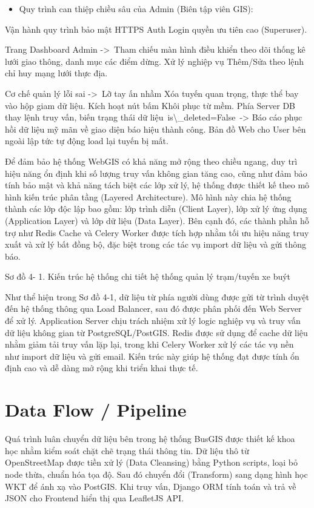 \documentclass[13pt,a4paper]{report}
\begin{document}
\begin{itemize}
    \item Quy trình can thiệp chiều sâu của Admin (Biên tập viên GIS):
\end{itemize}

Vận hành quy trình bảo mật HTTPS Auth Login quyền ưu tiên cao (Superuser).

Trang Dashboard Admin -> Tham chiếu màn hình điều khiển theo dõi thống kê lưới giao thông, danh mục các điểm dừng. Xử lý nghiệp vụ Thêm/Sửa theo lệnh chỉ huy mạng lưới thực địa.

Cơ chế quản lý lỗi sai -> Lỡ tay ấn nhầm Xóa tuyến quan trọng, thực thể bay vào hộp giam dữ liệu. Kích hoạt nút bấm Khôi phục từ mềm. Phía Server DB thay lệnh truy vấn, biến trạng thái dữ liệu is\textbackslash{}_deleted=False -> Báo cáo phục hồi dữ liệu mỹ mãn về giao diện báo hiệu thành công. Bản đồ Web cho User bên ngoài lập tức tự động load lại tuyến bị mất.

Để đảm bảo hệ thống WebGIS có khả năng mở rộng theo chiều ngang, duy trì hiệu năng ổn định khi số lượng truy vấn không gian tăng cao, cũng như đảm bảo tính bảo mật và khả năng tách biệt các lớp xử lý, hệ thống được thiết kế theo mô hình kiến trúc phân tầng (Layered Architecture). Mô hình này chia hệ thống thành các lớp độc lập bao gồm: lớp trình diễn (Client Layer), lớp xử lý ứng dụng (Application Layer) và lớp dữ liệu (Data Layer).
Bên cạnh đó, các thành phần hỗ trợ như Redis Cache và Celery Worker được tích hợp nhằm tối ưu hiệu năng truy xuất và xử lý bất đồng bộ, đặc biệt trong các tác vụ import dữ liệu và gửi thông báo.

Sơ đồ 4- 1. Kiến trúc hệ thống chi tiết hệ thống quản lý trạm/tuyến xe buýt

Như thể hiện trong Sơ đồ 4-1, dữ liệu từ phía người dùng được gửi từ trình duyệt đến hệ thống thông qua Load Balancer, sau đó được phân phối đến Web Server để xử lý. Application Server chịu trách nhiệm xử lý logic nghiệp vụ và truy vấn dữ liệu không gian từ PostgreSQL/PostGIS. Redis được sử dụng để cache dữ liệu nhằm giảm tải truy vấn lặp lại, trong khi Celery Worker xử lý các tác vụ nền như import dữ liệu và gửi email. Kiến trúc này giúp hệ thống đạt được tính ổn định cao và dễ dàng mở rộng khi triển khai thực tế.

\section{Data Flow / Pipeline}

Quá trình luân chuyển dữ liệu bên trong hệ thống BusGIS được thiết kế khoa học nhằm kiểm soát chặt chẽ trạng thái thông tin. Dữ liệu thô từ OpenStreetMap được tiền xử lý (Data Cleansing) bằng Python scripts, loại bỏ node thừa, chuẩn hóa tọa độ. Sau đó chuyển đổi (Transform) sang dạng hình học WKT để ánh xạ vào PostGIS. Khi truy vấn, Django ORM tính toán và trả về JSON cho Frontend hiển thị qua LeafletJS API.
\end{document}

